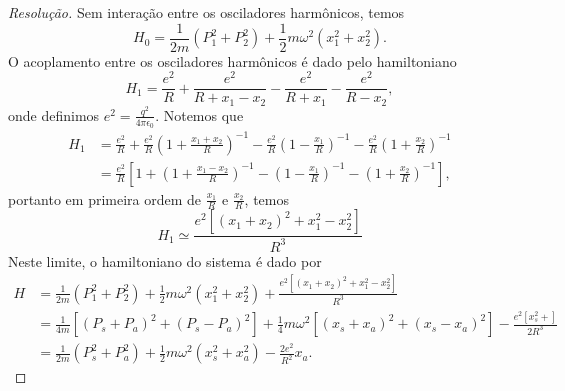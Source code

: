 \begin{proof}[Resolução]
    Sem interação entre os osciladores harmônicos, temos
    \begin{equation*}
        H_0 = \frac{1}{2m}(P_1^2 + P_2^2) + \frac{1}{2}m \omega^2 (x_1^2 + x_2^2).
    \end{equation*}
    O acoplamento entre os osciladores harmônicos é dado pelo hamiltoniano
    \begin{equation*}
        H_1 = \frac{e^2}{R} + \frac{e^2}{R + x_1 - x_2} - \frac{e^2}{R+x_1} - \frac{e^2}{R - x_2},
    \end{equation*}
    onde definimos \(e^2 = \frac{q^2}{4\pi \epsilon_0}\). Notemos que
    \begin{align*}
        H_1 &= \frac{e^2}{R} + \frac{e^2}{R}\left(1 + \frac{x_1 + x_2}{R}\right)^{-1} - \frac{e^2}{R} \left(1 - \frac{x_1}{R}\right)^{-1} - \frac{e^2}{R}\left(1 + \frac{x_2}{R}\right)^{-1} \\
            &= \frac{e^2}{R}\left[1 + \left(1 + \frac{x_1 - x_2}{R}\right)^{-1} - \left(1 - \frac{x_1}{R}\right)^{-1} - \left(1 + \frac{x_2}{R}\right)^{-1}\right],
    \end{align*}
    portanto em primeira ordem de \(\frac{x_1}{R}\) e \(\frac{x_2}{R}\), temos
    \begin{equation*}
        H_1 \simeq \frac{e^2\left[(x_1 + x_2)^2 + x_1^2 - x_2^2\right]}{R^3}
    \end{equation*}
    Neste limite, o hamiltoniano do sistema é dado por
    \begin{align*}
        H &= \frac{1}{2m}(P_1^2 + P_2^2) + \frac12 m \omega^2(x_1^2 + x_2^2) + \frac{e^2\left[(x_1 + x_2)^2 + x_1^2 - x_2^2\right]}{R^3}\\
          &= \frac{1}{4m}\left[(P_s + P_a)^2 + (P_s - P_a)^2\right] + \frac14 m \omega^2\left[(x_s + x_a)^2 + (x_s - x_a)^2\right] -\frac{e^2\left[x_s^2 + \right]}{2R^3}\\
          &= \frac{1}{2m}\left(P_s^2 + P_a^2\right) + \frac{1}{2}m \omega^2 \left(x_s^2 + x_a^2\right) - \frac{2e^2}{R^2} x_a.
    \end{align*}
\end{proof}
